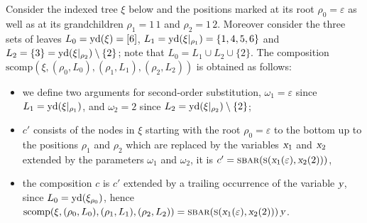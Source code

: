 \documentclass[../../document.tex]{subfiles}
\begin{document}
    \begin{example}\NoEndMark
        Consider the indexed tree \(\xi\) below and the positions marked at its root \(\rho_0 = \varepsilon\) as well as at its grandchildren \(\rho_1 = 1\,1\) and \(\rho_2=1\,2\).
        Moreover consider the three sets of leaves \(L_0 = \operatorname{yd}(\xi) = [6]\), \(L_1 = \operatorname{yd}(\xi|_{\rho_1}) = \{1,4,5,6\}\) and \(L_2 = \{3\} = \operatorname{yd}(\xi|_{\rho_2}) \setminus \{2\}\); note that \(L_0 = L_1 \cup L_2 \cup \{2\}\).
        The composition \(\mathrm{scomp}(\xi, (\rho_0, L_0), (\rho_1, L_1), (\rho_2, L_2))\) is obtained as follows:
        \begin{itemize}
            \item  we define two arguments for second-order substitution, \(\omega_1 = \varepsilon\) since \(L_1 = \operatorname{yd}(\xi|_{\rho_1})\), and \(\omega_2 = 2\) since \(L_2 = \operatorname{yd}(\xi|_{\rho_2}) \setminus \{2\}\);
            \item \(c'\) consists of the nodes in \(\xi\) starting with the root \(\rho_0 = \varepsilon\) to the bottom up to the positions \(\rho_1\) and \(\rho_2\) which are replaced by the variables \(\textsl{x}_1\) and \(\textsl{x}_2\) extended by the parameters \(\omega_1\) and \(\omega_2\), it is \(c' = \textsc{sbar}(\textsc{s} (\textsl{x}_1(\varepsilon), \textsl{x}_2(2)))\),
            \item the composition \(c\) is \(c'\) extended by a trailing occurrence of the variable \(\textsl{y}\), since \(L_0 = \operatorname{yd}(\xi_{\rho_0})\), hence \(\mathrm{scomp}(\xi, (\rho_0, L_0), (\rho_1, L_1), (\rho_2, L_2)) = \textsc{sbar}(\textsc{s} (\textsl{x}_1(\varepsilon), \textsl{x}_2(2))) \, \textsl{y}\).
        \end{itemize}
 

\end{example}
\end{document}

